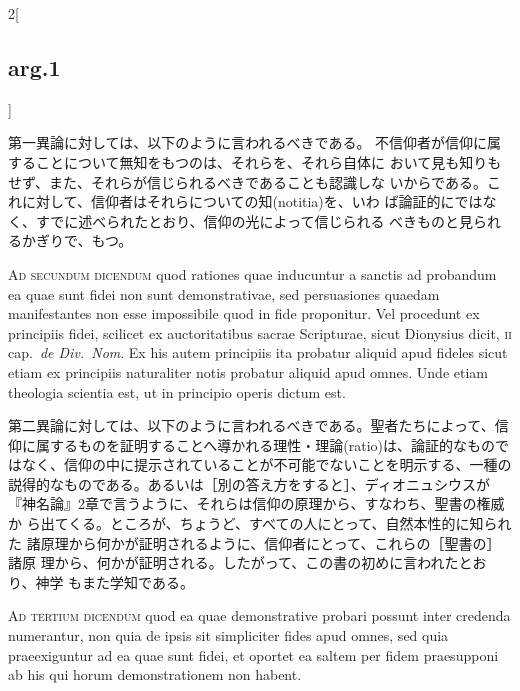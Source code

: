 \documentclass[paper=a4paper,fontsize=10pt,jafontsize=9pt,titlepage]{jlreq}
\begin{document}
\begin{paracol}{2}[\subsection{arg.1}]
\switchcolumn

第一異論に対しては、以下のように言われるべきである。
不信仰者が信仰に属することについて無知をもつのは、それらを、それら自体に
 おいて見も知りもせず、また、それらが信じられるべきであることも認識しな
 いからである。これに対して、信仰者はそれらについての知(notitia)を、いわ
 ば論証的にではなく、すでに述べられたとおり、信仰の光によって信じられる
 べきものと見られるかぎりで、もつ。

\switchcolumn*[\subsection{ad.2}]

{\scshape Ad secundum dicendum} quod rationes quae
inducuntur a sanctis ad probandum ea quae sunt fidei non sunt
demonstrativae, sed persuasiones quaedam manifestantes non esse
impossibile quod in fide proponitur. Vel procedunt ex principiis fidei,
scilicet ex auctoritatibus sacrae Scripturae, sicut Dionysius dicit,
 {\scshape ii} cap.~{\itshape de Div.~Nom}. Ex his autem principiis ita probatur aliquid apud
fideles sicut etiam ex principiis naturaliter notis probatur aliquid
apud omnes. Unde etiam theologia scientia est, ut in principio operis
dictum est.

\switchcolumn

第二異論に対しては、以下のように言われるべきである。聖者たちによって、信
仰に属するものを証明することへ導かれる理性・理論(ratio)は、論証的なもので
はなく、信仰の中に提示されていることが不可能でないことを明示する、一種の
説得的なものである。あるいは［別の答え方をすると］、ディオニュシウスが
『神名論』2章で言うように、それらは信仰の原理から、すなわち、聖書の権威か
ら出てくる。ところが、ちょうど、すべての人にとって、自然本性的に知られた
諸原理から何かが証明されるように、信仰者にとって、これらの［聖書の］諸原
理から、何かが証明される。したがって、この書の初めに言われたとおり、神学
もまた学知である。

\switchcolumn*[\subsection{ad.3}]

{\scshape Ad tertium dicendum} quod ea quae
demonstrative probari possunt inter credenda numerantur, non quia de
ipsis sit simpliciter fides apud omnes, sed quia praeexiguntur ad ea
quae sunt fidei, et oportet ea saltem per fidem praesupponi ab his qui
horum demonstrationem non habent.

\switchcolumn


\end{paracol}
\end{document}
